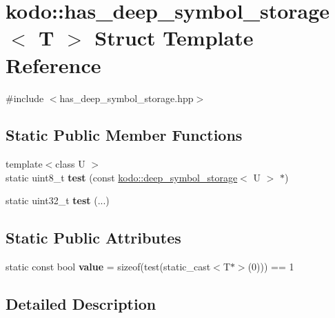 \hypertarget{structkodo_1_1has__deep__symbol__storage}{\section{kodo\-:\-:has\-\_\-deep\-\_\-symbol\-\_\-storage$<$ T $>$ Struct Template Reference}
\label{structkodo_1_1has__deep__symbol__storage}
}


{\ttfamily \#include $<$has\-\_\-deep\-\_\-symbol\-\_\-storage.\-hpp$>$}

\subsection*{Static Public Member Functions}
\begin{DoxyCompactItemize}
\item 
\hypertarget{structkodo_1_1has__deep__symbol__storage_aad653f6ec914c908c04ac0e559be2509}{{\footnotesize template$<$class U $>$ }\\static uint8\-\_\-t {\bfseries test} (const \hyperlink{classkodo_1_1deep__symbol__storage}{kodo\-::deep\-\_\-symbol\-\_\-storage}$<$ U $>$ $\ast$)}\label{structkodo_1_1has__deep__symbol__storage_aad653f6ec914c908c04ac0e559be2509}

\item 
\hypertarget{structkodo_1_1has__deep__symbol__storage_afd88fc29b11c032742e50f5d6066226d}{static uint32\-\_\-t {\bfseries test} (...)}\label{structkodo_1_1has__deep__symbol__storage_afd88fc29b11c032742e50f5d6066226d}

\end{DoxyCompactItemize}
\subsection*{Static Public Attributes}
\begin{DoxyCompactItemize}
\item 
\hypertarget{structkodo_1_1has__deep__symbol__storage_ad68c3028df0d46f2b7f8aaa6caea43cd}{static const bool {\bfseries value} = sizeof(test(static\-\_\-cast$<$T$\ast$$>$(0))) == 1}\label{structkodo_1_1has__deep__symbol__storage_ad68c3028df0d46f2b7f8aaa6caea43cd}

\end{DoxyCompactItemize}


\subsection{Detailed Description}
